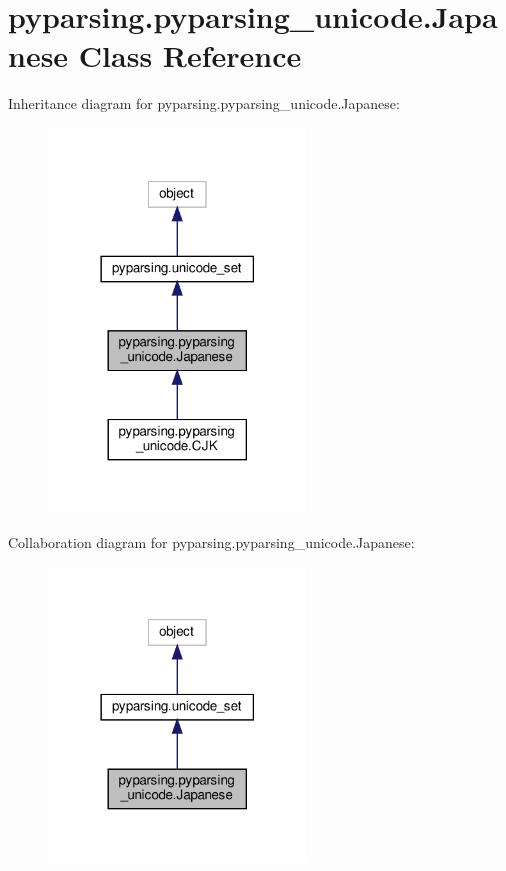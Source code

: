 \hypertarget{classpyparsing_1_1pyparsing__unicode_1_1Japanese}{}\section{pyparsing.\+pyparsing\+\_\+unicode.\+Japanese Class Reference}
\label{classpyparsing_1_1pyparsing__unicode_1_1Japanese}


Inheritance diagram for pyparsing.\+pyparsing\+\_\+unicode.\+Japanese\+:
\nopagebreak
\begin{figure}[H]
\begin{center}
\leavevmode
\includegraphics[width=194pt]{classpyparsing_1_1pyparsing__unicode_1_1Japanese__inherit__graph}
\end{center}
\end{figure}


Collaboration diagram for pyparsing.\+pyparsing\+\_\+unicode.\+Japanese\+:
\nopagebreak
\begin{figure}[H]
\begin{center}
\leavevmode
\includegraphics[width=194pt]{classpyparsing_1_1pyparsing__unicode_1_1Japanese__coll__graph}
\end{center}
\end{figure}
